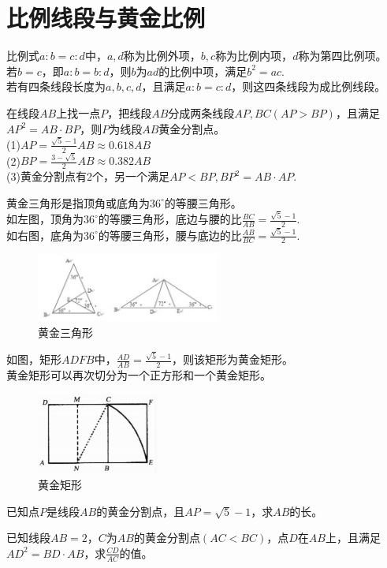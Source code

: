 \documentclass{ecnuthesis}
\begin{document}
\section{比例线段与黄金比例}
\begin{knowledge}
    比例式$a:b=c:d$中，$a,d$称为比例外项，$b,c$称为比例内项，$d$称为第四比例项。\\
    若$b=c$，即$a:b=b:d$，则$b$为$ad$的比例中项，满足$b^2=ac$. \\
    若有四条线段长度为$a,b,c,d$，且满足$a:b=c:d$，则这四条线段为成比例线段。
\end{knowledge}
\begin{knowledge}
    在线段$AB$上找一点$P$，把线段$AB$分成两条线段$AP,BC(AP>BP)$，且满足$AP^2=AB·BP$，则$P$为线段$AB$黄金分割点。\\
    (1)$AP=\frac{\sqrt5 - 1}{2}AB \approx 0.618AB$ \\
    (2)$BP=\frac{3 - \sqrt5}{2}AB \approx 0.382AB$ \\
    (3)黄金分割点有2个，另一个满足$AP<BP,BP^2=AB·AP.$
\end{knowledge}
\begin{model}
    黄金三角形是指顶角或底角为$36^\circ$的等腰三角形。\\
    如左图，顶角为$36^\circ$的等腰三角形，底边与腰的比$\frac{BC}{AB}=\frac{\sqrt5-1}{2}$. \\
    如右图，底角为$36^\circ$的等腰三角形，腰与底边的比$\frac{AB}{BC}=\frac{\sqrt5-1}{2}$. \\
\end{model}
\begin{figure}[H]
\centering
\includegraphics[width=6cm]{picture/801.png}
\caption{黄金三角形}
\end{figure}
\begin{model}
    如图，矩形$ADFB$中，$\frac{AD}{AB}=\frac{\sqrt5-1}{2}$，则该矩形为黄金矩形。\\
    黄金矩形可以再次切分为一个正方形和一个黄金矩形。
\end{model}
\begin{figure}[H]
\centering
\includegraphics[width=4cm]{picture/859.png}
\caption{黄金矩形}
\end{figure}
\begin{problem}
    已知点$P$是线段$AB$的黄金分割点，且$AP=\sqrt5-1$，求$AB$的长。\\
\end{problem}
\begin{problem}
    已知线段$AB=2$，$C$为$AB$的黄金分割点$(AC<BC)$，点$D$在$AB$上，且满足$AD^2=BD·AB$，求$\frac{CD}{AC}$的值。
\end{problem}
\clearpage
\end{document}
